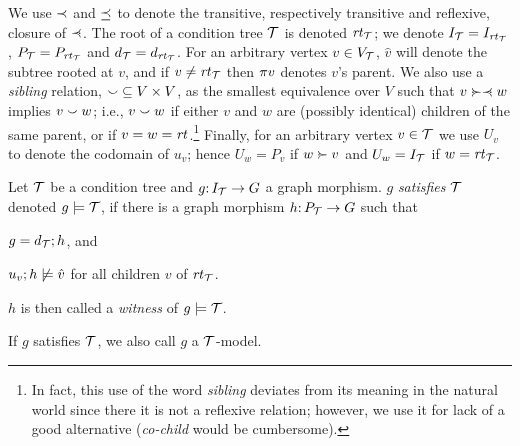 We use $\prec$ and $\preceq$ to denote the transitive, respectively transitive and reflexive, closure of $\parentof$. The root of a condition tree ${\mathcal{T}}$ is denoted $\mathit{rt}_{{\mathcal{T}}}$; we denote $I_{\mathcal{T}}=I_{\mathit{rt}_{{\mathcal{T}}}}$, $P_{\mathcal{T}}=P_{\mathit{rt}_{{\mathcal{T}}}}$ and $d_{\mathcal{T}}=d_{\mathit{rt}_{{\mathcal{T}}}}$. For an arbitrary vertex $v\in V_{\mathcal{T}}$, $\hat v$ will denote the subtree rooted at $v$, and if $v\neq\mathit{rt}_{{\mathcal{T}}}$ then $\pi{v}$ denotes $v$'s parent. We also use a \emph{sibling} relation, ${\smallsmile}\subseteq V\times V$, as the smallest equivalence over $V$ such that $v\childof\parentof w$ implies $v\smallsmile w$; i.e., $v\smallsmile w$ if either $v$ and $w$ are (possibly identical) children of the same parent, or if $v=w=\mathit{rt}_{}$.\footnote{In fact, this use of the word \emph{sibling} deviates from its meaning in the natural world since there it is not a reflexive relation; however, we use it for lack of a good alternative (\emph{co-child} would be cumbersome).} Finally, for an arbitrary vertex $v\in {\mathcal{T}}$ we use $U_v$ to denote the codomain of $u_v$; hence $U_w=P_v$ if $w\childof v$ and $U_w=I_{\mathcal{T}}$ if $w=\mathit{rt}_{{\mathcal{T}}}$.

\begin{definition}[satisfaction]\label{def:satisfaction}
Let ${\mathcal{T}}$ be a condition tree and $g{:}\, I_{\mathcal{T}}\rightarrow G$ a graph morphism. $g$ \emph{satisfies ${\mathcal{T}}$} denoted $g\models {\mathcal{T}}$, if there is a graph morphism $h{:}\, P_{\mathcal{T}}\rightarrow G$ such that
\begin{inumerate}
\item $g=d_{\mathcal{T}};h$, and 
\item $u_v;h\not\models \hat v$ for all children $v$ of $\mathit{rt}_{{\mathcal{T}}}$.
\end{inumerate}
$h$ is then called a \emph{witness} of $g\models {\mathcal{T}}$.
\end{definition}
%
If $g$ satisfies ${\mathcal{T}}$, we also call $g$ a ${\mathcal{T}}$-model.


